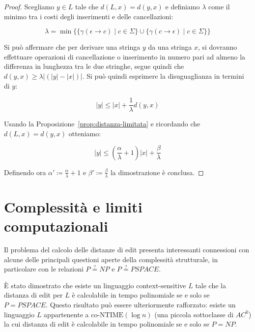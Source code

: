 \documentclass[a4paper,12pt]{report}
\theoremstyle{propositionstyle}
\begin{document}
    \begin{proof}
        Scegliamo $y \in L$ tale che $d\left(L, x\right) = d\left(y, x\right)$ e definiamo $\lambda$ come il minimo tra i costi degli inserimenti e delle cancellazioni:

        $$ \lambda = \min\bigl\{\{\gamma\left(\epsilon \rightarrow c\right) \mid c \in \Sigma\} \cup \{\gamma\left(c \rightarrow \epsilon\right) \mid c \in \Sigma\}\bigr\}$$

        Si può affermare che per derivare una stringa $y$ da una stringa $x$, si dovranno effettuare operazioni di cancellazione o inserimento in numero pari
        ad almeno la differenza in lunghezza tra le due stringhe, segue quindi che $d\left(y, x\right) \geq \lambda\bigl|\left(\lvert y \rvert - \lvert x \rvert\right)\bigr|$.
        Si può quindi esprimere la disuguaglianza in termini di $y$:

        $$\lvert y \rvert \leq \lvert x \rvert + \frac{1}{\lambda}d\left(y, x\right)$$

        Usando la Proposizione~\ref{prop:distanza-limitata} e ricordando che $d\left(L, x\right) = d\left(y, x\right)$ otteniamo:

        $$\lvert y \rvert \leq \left(\frac{\alpha}{\lambda} + 1\right)\lvert x \rvert + \frac{\beta}{\lambda}$$
        \vspace{0.5em}

        Definendo ora $\displaystyle \alpha' \coloneqq \frac{\alpha}{\lambda} + 1$ e $\displaystyle \beta' \coloneqq \frac{\beta}{\lambda}$ la dimostrazione è conclusa.
    \end{proof}


    \section{Complessità e limiti computazionali}

    Il problema del calcolo delle distanze di edit presenta interessanti connessioni con alcune delle principali questioni aperte della complessità strutturale, in particolare con le relazioni $P \stackrel{?}{=} NP$ e $P \stackrel{?}{=} PSPACE$.

    È stato dimostrato che esiste un linguaggio context-sensitive $L$ tale che la distanza di edit per $L$ è calcolabile in tempo polinomiale se e solo se $P = PSPACE$. Questo risultato può essere ulteriormente rafforzato: esiste un linguaggio $L$ appartenente a $\text{co-NTIME}(\log n)$ (una piccola sottoclasse di $AC^0$) la cui distanza di edit è calcolabile in tempo polinomiale se e solo se $P = NP$.
\end{document}
